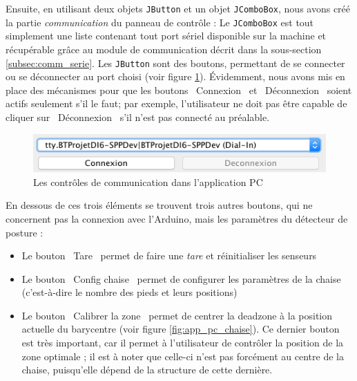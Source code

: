 \documentclass{polytech/polytech}
\begin{document}
Ensuite, en utilisant deux objets \texttt{JButton} et un objet \texttt{JComboBox}, nous avons créé la partie \textit{communication} du panneau de contrôle : Le \texttt{JComboBox} est tout simplement une liste contenant tout port sériel disponible sur la machine et récupérable grâce au module de communication décrit dans la sous-section \ref{subsec:comm_serie}. Les \texttt{JButton} sont des boutons, permettant de se connecter ou se déconnecter au port choisi (voir figure \ref{fig:app_pc_comms}). Évidemment, nous avons mis en place des mécanismes pour que les boutons \guillemotleft\ Connexion \guillemotright\ et \guillemotleft\ Déconnexion \guillemotright\ soient actifs seulement s'il le faut; par exemple, l'utilisateur ne doit pas être capable de cliquer sur \guillemotleft\ Déconnexion \guillemotright\ s'il n'est pas connecté au préalable.

\begin{figure}[htbp]
\begin{center}
\includegraphics[width=12cm]{image/app_pc_comms}
\end{center}
\caption{Les contrôles de communication dans l'application PC}
\label{fig:app_pc_comms}
\end{figure}

En dessous de ces trois éléments se trouvent trois autres boutons, qui ne concernent pas la connexion avec l'Arduino, mais les paramètres du détecteur de posture : 
\begin{itemize}
\item Le bouton \guillemotleft\ Tare \guillemotright\ permet de faire une \textit{tare} et réinitialiser les senseurs
\item Le bouton \guillemotleft\ Config chaise \guillemotright\ permet de configurer les paramètres de la chaise (c'est-à-dire le nombre des pieds et leurs positions)
\item Le bouton \guillemotleft\ Calibrer la zone \guillemotright\ permet de centrer la deadzone à la position actuelle du barycentre (voir figure \ref{fig:app_pc_chaise}). Ce dernier bouton est très important, car il permet à l'utilisateur de contrôler la position de la zone optimale ; il est à noter que celle-ci n'est pas forcément au centre de la chaise, puisqu’elle dépend de la structure de cette dernière.
\end{itemize}
\end{document}

